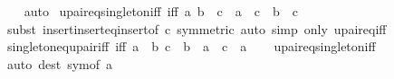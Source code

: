 \begin{isabellebody}
%
\isadelimproof
\ \ %
\endisadelimproof
%
\isatagproof
{}\isamarkupfalse%
\ auto%
\endisatagproof
{\isafoldproof}%
%
\isadelimproof
\isanewline
%
\endisadelimproof
\isanewline
{}\isamarkupfalse%
\ upair{\isacharunderscore}{\kern0pt}eq{\isacharunderscore}{\kern0pt}singleton{\isacharunderscore}{\kern0pt}iff\ {\isacharbrackleft}{\kern0pt}iff{\isacharbrackright}{\kern0pt}{\isacharcolon}{\kern0pt}\ {\isachardoublequoteopen}{\isacharbraceleft}{\kern0pt}a{\isacharcomma}{\kern0pt}\ b{\isacharbraceright}{\kern0pt}\ {\isacharequal}{\kern0pt}\ {\isacharbraceleft}{\kern0pt}c{\isacharbraceright}{\kern0pt}\ {\isasymlongleftrightarrow}\ a\ {\isacharequal}{\kern0pt}\ c\ {\isasymand}\ b\ {\isacharequal}{\kern0pt}\ c{\isachardoublequoteclose}\isanewline
%
\isadelimproof
\ \ %
\endisadelimproof
%
\isatagproof
{}\isamarkupfalse%
\ {\isacharparenleft}{\kern0pt}subst\ insert{\isacharunderscore}{\kern0pt}insert{\isacharunderscore}{\kern0pt}eq{\isacharunderscore}{\kern0pt}insert{\isacharbrackleft}{\kern0pt}of\ c{\isacharcomma}{\kern0pt}\ symmetric{\isacharbrackright}{\kern0pt}{\isacharparenright}{\kern0pt}\ {\isacharparenleft}{\kern0pt}auto\ simp\ only{\isacharcolon}{\kern0pt}\ upair{\isacharunderscore}{\kern0pt}eq{\isacharunderscore}{\kern0pt}iff{\isacharparenright}{\kern0pt}%
\endisatagproof
{\isafoldproof}%
%
\isadelimproof
\isanewline
%
\endisadelimproof
\isanewline
{}\isamarkupfalse%
\ singleton{\isacharunderscore}{\kern0pt}eq{\isacharunderscore}{\kern0pt}upair{\isacharunderscore}{\kern0pt}iff\ {\isacharbrackleft}{\kern0pt}iff{\isacharbrackright}{\kern0pt}{\isacharcolon}{\kern0pt}\ {\isachardoublequoteopen}{\isacharbraceleft}{\kern0pt}a{\isacharbraceright}{\kern0pt}\ {\isacharequal}{\kern0pt}\ {\isacharbraceleft}{\kern0pt}b{\isacharcomma}{\kern0pt}\ c{\isacharbraceright}{\kern0pt}\ {\isasymlongleftrightarrow}\ b\ {\isacharequal}{\kern0pt}\ a\ {\isasymand}\ c\ {\isacharequal}{\kern0pt}\ a{\isachardoublequoteclose}\isanewline
%
\isadelimproof
\ \ %
\endisadelimproof
%
\isatagproof
{}\isamarkupfalse%
\ upair{\isacharunderscore}{\kern0pt}eq{\isacharunderscore}{\kern0pt}singleton{\isacharunderscore}{\kern0pt}iff\ \isamarkupfalse%
\ {\isacharparenleft}{\kern0pt}auto\ dest{\isacharcolon}{\kern0pt}\ sym{\isacharbrackleft}{\kern0pt}of\ {\isachardoublequoteopen}{\isacharbraceleft}{\kern0pt}a{\isacharbraceright}{\kern0pt}{\isachardoublequoteclose}{\isacharbrackright}{\kern0pt}{\isacharparenright}{\kern0pt}%
\endisatagproof
{\isafoldproof}%
%
\isadelimproof
%
\endisadelimproof
%
\begin{isamarkuptext}%

\end{isamarkuptext}
\end{isabellebody}
